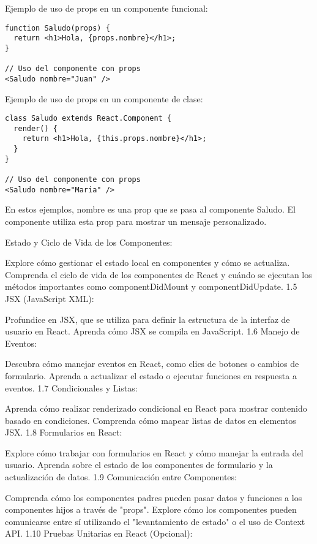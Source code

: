 \documentclass[executivepaper]{article}
\begin{document}
Ejemplo de uso de props en un componente funcional:

\begin{lstlisting}
function Saludo(props) {
  return <h1>Hola, {props.nombre}</h1>;
}

// Uso del componente con props
<Saludo nombre="Juan" />
\end{lstlisting}

Ejemplo de uso de props en un componente de clase:

\begin{lstlisting}
class Saludo extends React.Component {
  render() {
    return <h1>Hola, {this.props.nombre}</h1>;
  }
}

// Uso del componente con props
<Saludo nombre="Maria" />  
\end{lstlisting}

En estos ejemplos, nombre es una prop que se pasa al componente Saludo. El componente utiliza esta prop para mostrar un mensaje personalizado.





 Estado y Ciclo de Vida de los Componentes:

Explore cómo gestionar el estado local en componentes y cómo se actualiza.
Comprenda el ciclo de vida de los componentes de React y cuándo se ejecutan los métodos importantes como componentDidMount y componentDidUpdate.
1.5 JSX (JavaScript XML):

Profundice en JSX, que se utiliza para definir la estructura de la interfaz de usuario en React.
Aprenda cómo JSX se compila en JavaScript.
1.6 Manejo de Eventos:

Descubra cómo manejar eventos en React, como clics de botones o cambios de formulario.
Aprenda a actualizar el estado o ejecutar funciones en respuesta a eventos.
1.7 Condicionales y Listas:

Aprenda cómo realizar renderizado condicional en React para mostrar contenido basado en condiciones.
Comprenda cómo mapear listas de datos en elementos JSX.
1.8 Formularios en React:

Explore cómo trabajar con formularios en React y cómo manejar la entrada del usuario.
Aprenda sobre el estado de los componentes de formulario y la actualización de datos.
1.9 Comunicación entre Componentes:

Comprenda cómo los componentes padres pueden pasar datos y funciones a los componentes hijos a través de "props".
Explore cómo los componentes pueden comunicarse entre sí utilizando el "levantamiento de estado" o el uso de Context API.
1.10 Pruebas Unitarias en React (Opcional):
\end{document}
